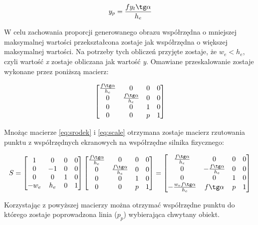 \begin{equation}
y_{p} = \frac{fy_{t} \tg \alpha}{h_{e}}
\end{equation}

W celu zachowania proporcji generowanego obrazu współrzędna o mniejszej
maksymalnej wartości przekształcona zostaje jak współrzędna o większej
maksymalnej wartości. Na potrzeby tych obliczeń przyjęte zostaje, że $ w_{e} <
h_{e} $, czyli wartość \emph{x} zostaje obliczana jak wartość \emph{y}.
Omawiane przeskalowanie zostaje wykonane przez poniższą macierz:

\begin{equation}
\begin{bmatrix}\frac{f \tg \alpha}{h_{e}}&0&0&0\\0&\frac{f \tg \alpha}{h_{e}}&0&0\\0&0&1&0\\0&0&p&1\end{bmatrix}
\label{eq:scale}
\end{equation}

Mnożąc macierze \ref{eq:srodek} i \ref{eq:scale} otrzymana zostaje macierz
rzutowania punktu z współrzędnych ekranowych na współrzędne silnika fizycznego:

\begin{equation}
S = 
\begin{bmatrix}1&0&0&0\\0&-1&0&0\\0&0&1&0\\-w_{e}&h_{e}&0&1\end{bmatrix}
\begin{bmatrix}\frac{f \tg \alpha}{h_{e}}&0&0&0\\0&\frac{f \tg
\alpha}{h_{e}}&0&0\\0&0&1&0\\0&0&p&1\end{bmatrix} =
\begin{bmatrix}\frac{f \tg \alpha}{h_{e}}&0&0&0\\0&-\frac{f \tg
\alpha}{h_{e}}&0&0\\0&0&1&0\\-\frac{w_{e}f \tg \alpha}{h_{e}}&f \tg \alpha&p&1\end{bmatrix}
\end{equation}

Korzystając z powyższej macierzy można otrzymać współrzędne punktu do którego
zostaje poprowadzona linia ($ p_{p} $) wybierająca chwytany obiekt.

